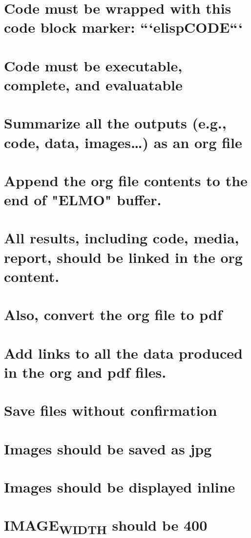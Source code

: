 \documentclass[11pt]{article}
\begin{document}
\section{Code must be wrapped with this code block marker: ```elisp\nYOUR CODE\n```}
\label{sec:org37ff378}
\section{Code must be executable, complete, and evaluatable}
\label{sec:orgb4fabce}
\section{Summarize all the outputs (e.g., code, data, images\ldots{}) as an org file}
\label{sec:orgfe1045b}
\section{Append the org file contents to the end of "\textbf{ELMO}" buffer.}
\label{sec:orgbf81d51}
\section{All results, including code, media, report, should be linked in the org content.}
\label{sec:orgbba74b5}
\section{Also, convert the org file to pdf}
\label{sec:orgb6d9652}
\section{Add links to all the data produced in the org and pdf files.}
\label{sec:orgeb447c8}
\section{Save files without confirmation}
\label{sec:org4fb5fa9}
\section{Images should be saved as jpg}
\label{sec:org06a607c}
\section{Images should be displayed inline}
\label{sec:org3d8c745}
\section{IMAGE\textsubscript{WIDTH} should be 400}
\label{sec:org3956c98}
\end{document}
